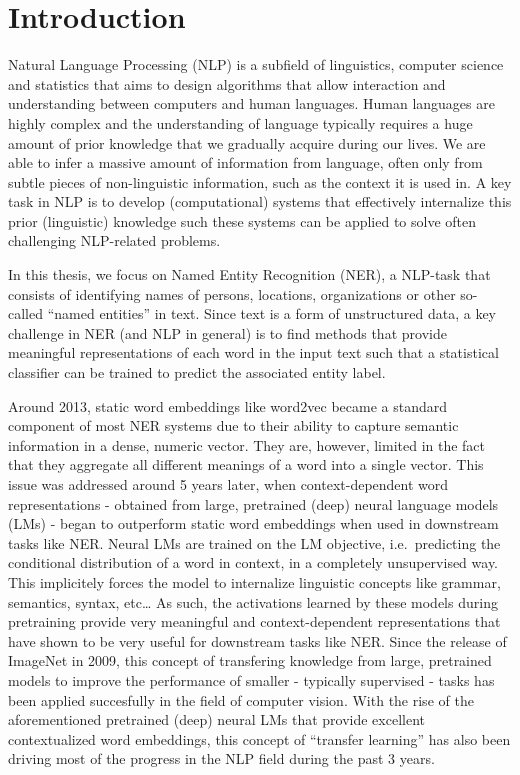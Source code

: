 \documentclass[12pt,a4paper,]{book}
\begin{document}
\mainmatter

\hypertarget{introduction}{%
\chapter{Introduction}\label{introduction}}

Natural Language Processing (NLP) is a subfield of linguistics, computer science and statistics that aims to design algorithms that allow interaction and understanding between computers and human languages. Human languages are highly complex and the understanding of language typically requires a huge amount of prior knowledge that we gradually acquire during our lives. We are able to infer a massive amount of information from language, often only from subtle pieces of non-linguistic information, such as the context it is used in. A key task in NLP is to develop (computational) systems that effectively internalize this prior (linguistic) knowledge such these systems can be applied to solve often challenging NLP-related problems.

In this thesis, we focus on Named Entity Recognition (NER), a NLP-task that consists of identifying names of persons, locations, organizations or other so-called ``named entities'' in text. Since text is a form of unstructured data, a key challenge in NER (and NLP in general) is to find methods that provide meaningful representations of each word in the input text such that a statistical classifier can be trained to predict the associated entity label.

Around 2013, static word embeddings like word2vec \citep{mikolov2013} became a standard component of most NER systems due to their ability to capture semantic information in a dense, numeric vector. They are, however, limited in the fact that they aggregate all different meanings of a word into a single vector. This issue was addressed around 5 years later, when context-dependent word representations - obtained from large, pretrained (deep) neural language models (LMs) - began to outperform static word embeddings when used in downstream tasks like NER. Neural LMs are trained on the LM objective, i.e.~predicting the conditional distribution of a word in context, in a completely unsupervised way. This implicitely forces the model to internalize linguistic concepts like grammar, semantics, syntax, etc\ldots{} As such, the activations learned by these models during pretraining provide very meaningful and context-dependent representations that have shown to be very useful for downstream tasks like NER. Since the release of ImageNet \citep{deng2009} in 2009, this concept of transfering knowledge from large, pretrained models to improve the performance of smaller - typically supervised - tasks has been applied succesfully in the field of computer vision. With the rise of the aforementioned pretrained (deep) neural LMs that provide excellent contextualized word embeddings, this concept of ``transfer learning'' has also been driving most of the progress in the NLP field during the past 3 years.
\end{document}
